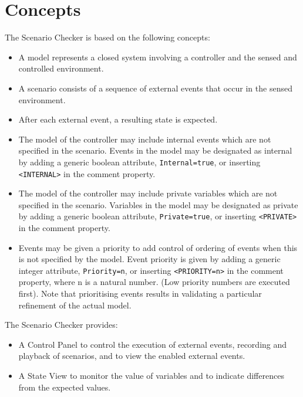 
\section{Concepts}
\label{sec:concepts}

The Scenario Checker is based on the following concepts:
\begin{itemize}
		\item A model represents a closed system involving a controller and the sensed and controlled environment.
		\item A scenario consists of a sequence of external events that occur in the sensed environment. 
		\item After each external event, a resulting state is expected.
		\item The model of the controller may include internal events which are not specified in the scenario. 
		Events in the model may be designated as internal by adding a generic boolean attribute, \texttt{Internal=true}, or inserting \texttt{<INTERNAL>} in the comment property.
		\item The model of the controller may include private variables which are not specified in the scenario.
		Variables in the model may be designated as private by adding a generic boolean attribute, \texttt{Private=true}, or inserting \texttt{<PRIVATE>} in the comment property.
		\item Events may be given a priority to add control of ordering of events when this is not specified by the model. 
		Event priority is given by adding a generic integer attribute, \texttt{Priority=n}, or inserting \texttt{<PRIORITY=n>} in the comment property, where n is a natural number.
		(Low priority numbers are executed first).
		Note that prioritising events results in validating a particular refinement of the actual model.
\end{itemize}
	
The Scenario Checker provides:
\begin{itemize}
	\item A Control Panel to control the execution of external events, recording and playback of scenarios, and to view the enabled external events.
	\item A State View to monitor the value of variables and to indicate differences from the expected values.
\end{itemize}


